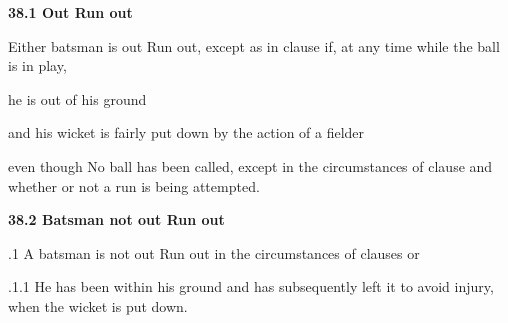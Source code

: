 \documentclass[12pt]{article}
\begin{document}
\vspace{\baselineskip}
{\fontsize{11pt}{13.2pt}\selectfont \textbf{38.1 \tabto{0.47in} Out Run out}\par}\par


\vspace{\baselineskip}
{\fontsize{9pt}{10.8pt}\selectfont Either batsman is out Run out, except as in clause if, at any time while the ball is in play,\par}\par


\vspace{\baselineskip}
{\fontsize{9pt}{10.8pt}\selectfont he is out of his ground\par}\par


\vspace{\baselineskip}
{\fontsize{9pt}{10.8pt}\selectfont and his wicket is fairly put down by the action of a fielder\par}\par


\vspace{\baselineskip}
\begin{adjustwidth}{0.0in}{0.29in}
{\fontsize{9pt}{10.8pt}\selectfont even though No ball has been called, except in the circumstances of clause and whether or not a run is being attempted.\par}\par

\end{adjustwidth}


\vspace{\baselineskip}
{\fontsize{11pt}{13.2pt}\selectfont \textbf{38.2 \tabto{0.47in} Batsman not out Run out}\par}\par


\vspace{\baselineskip}
{\fontsize{9pt}{10.8pt}.1 \tabto{0.49in} A batsman is not out Run out in the circumstances of clauses or \par}\par


\vspace{\baselineskip}
\begin{adjustwidth}{1.18in}{0.19in}
{\fontsize{9pt}{10.8pt}.1.1 \tabto{1.17in} He has been within his ground and has subsequently left it to avoid injury, when the wicket is put down.\par}\par

\end{adjustwidth}
\end{document}
